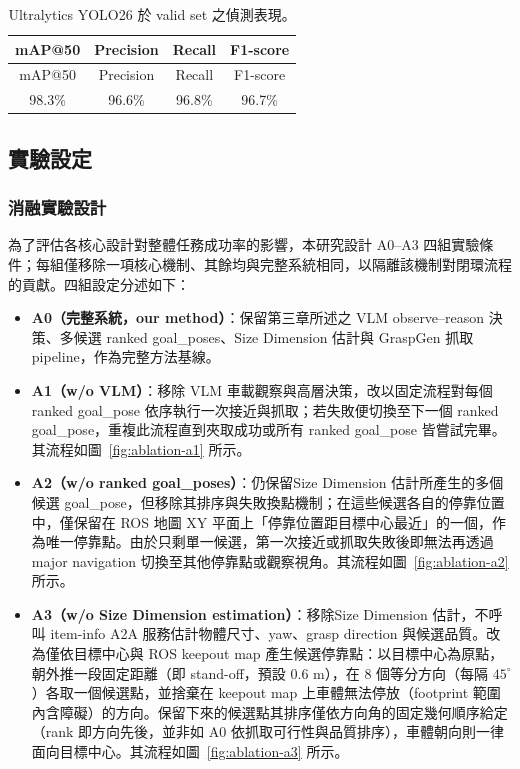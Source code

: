 \documentclass[12pt,a4paper]{article}
\begin{document}
\begingroup
\small
\setlength{\tabcolsep}{12pt}
\begin{longtable}{@{}cccc@{}}
\caption{Ultralytics YOLO26 於 valid set 之偵測表現。}\label{tab:yolo-metrics}\\
\toprule
mAP@50 & Precision & Recall & F1-score \\
\midrule
\endfirsthead
\toprule
mAP@50 & Precision & Recall & F1-score \\
\midrule
\endhead
98.3\% & 96.6\% & 96.8\% & 96.7\% \\
\bottomrule
\end{longtable}
\endgroup

\subsection{實驗設定}

\subsubsection{消融實驗設計}

為了評估各核心設計對整體任務成功率的影響，本研究設計 A0--A3 四組實驗條件；每組僅移除一項核心機制、其餘均與完整系統相同，以隔離該機制對閉環流程的貢獻。四組設定分述如下：

\begin{itemize}
  \item \textbf{A0（完整系統，our method）}：保留第三章所述之 VLM observe--reason 決策、多候選 ranked goal\_poses、Size Dimension 估計與 GraspGen 抓取 pipeline，作為完整方法基線。
  \item \textbf{A1（w/o VLM）}：移除 VLM 車載觀察與高層決策，改以固定流程對每個 ranked goal\_pose 依序執行一次接近與抓取；若失敗便切換至下一個 ranked goal\_pose，重複此流程直到夾取成功或所有 ranked goal\_pose 皆嘗試完畢。其流程如圖~\ref{fig:ablation-a1} 所示。
  \item \textbf{A2（w/o ranked goal\_poses）}：仍保留Size Dimension 估計所產生的多個候選 goal\_pose，但移除其排序與失敗換點機制；在這些候選各自的停靠位置中，僅保留在 ROS 地圖 XY 平面上「停靠位置距目標中心最近」的一個，作為唯一停靠點。由於只剩單一候選，第一次接近或抓取失敗後即無法再透過 major navigation 切換至其他停靠點或觀察視角。其流程如圖~\ref{fig:ablation-a2} 所示。
  \item \textbf{A3（w/o Size Dimension estimation）}：移除Size Dimension 估計，不呼叫 item-info A2A 服務估計物體尺寸、yaw、grasp direction 與候選品質。改為僅依目標中心與 ROS keepout map 產生候選停靠點：以目標中心為原點，朝外推一段固定距離（即 stand-off，預設 $0.6$ m），在 $8$ 個等分方向（每隔 $45^{\circ}$）各取一個候選點，並捨棄在 keepout map 上車體無法停放（footprint 範圍內含障礙）的方向。保留下來的候選點其排序僅依方向角的固定幾何順序給定（rank 即方向先後，並非如 A0 依抓取可行性與品質排序），車體朝向則一律面向目標中心。其流程如圖~\ref{fig:ablation-a3} 所示。
\end{itemize}
\end{document}
